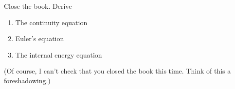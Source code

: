 
  Close the book.  Derive
  \begin{enumerate}
      \item {} The continuity equation
      \item {} Euler's equation
      \item {} The internal energy equation
  \end{enumerate}
  (Of course, I can't check that you closed the book this time. Think of this a
  foreshadowing.)

